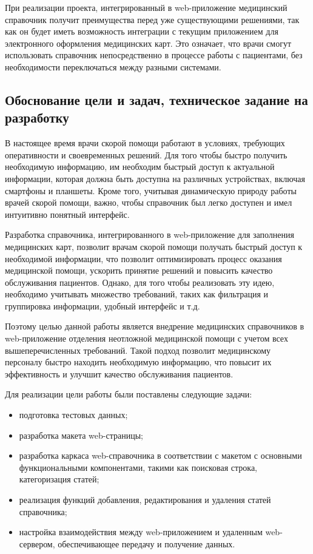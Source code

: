 При реализации проекта, интегрированный в web-приложение медицинский справочник получит преимущества перед уже существующими решениями, так как он будет иметь возможность интеграции с текущим приложением для электронного оформления медицинских карт. Это означает, что врачи смогут использовать справочник непосредственно в процессе работы с пациентами, без необходимости переключаться между разными системами. 

\subsection{Обоснование цели и задач, техническое задание на разработку}
В настоящее время врачи скорой помощи работают в условиях, требующих оперативности и своевременных решений. Для того чтобы быстро получить необходимую информацию, им необходим быстрый доступ к актуальной информации, которая должна быть доступна на различных устройствах, включая смартфоны и планшеты. Кроме того, учитывая динамическую природу работы врачей скорой помощи, важно, чтобы справочник был легко доступен и имел интуитивно понятный интерфейс.

Разработка справочника, интегрированного в web-приложение для заполнения медицинских карт, позволит врачам скорой помощи получать быстрый доступ к необходимой информации, что позволит оптимизировать процесс оказания медицинской помощи, ускорить принятие решений и повысить качество обслуживания пациентов. Однако, для того чтобы реализовать эту идею, необходимо учитывать множество требований, таких как фильтрация и группировка информации, удобный интерфейс и т.д.

Поэтому целью данной работы является внедрение медицинских справочников в web-приложение отделения неотложной медицинской помощи с учетом всех вышеперечисленных требований. Такой подход позволит медицинскому персоналу быстро находить необходимую информацию, что повысит их эффективность и улучшит качество обслуживания пациентов.

Для реализации цели работы были поставлены следующие задачи:
\begin{itemize}
    \item подготовка тестовых данных;
    \item разработка макета web-страницы;
    \item разработка каркаса web-справочника в соответствии с макетом с основными функциональными компонентами, такими как поисковая строка, категоризация статей;
    \item реализация функций добавления, редактирования и удаления статей справочника;
    \item настройка взаимодействия между web-приложением и удаленным web-сервером, обеспечивающее передачу и получение данных.
\end{itemize}

